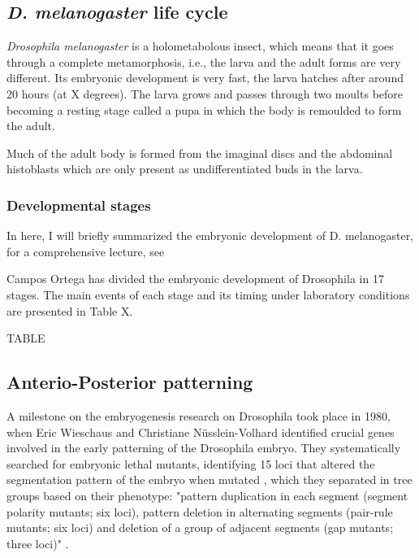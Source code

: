 \subsection{\textit{D. melanogaster} life cycle}

\textit{Drosophila melanogaster} is a holometabolous insect, which means that it goes through a complete metamorphosis, i.e., the larva and the adult forms are very different.
Its embryonic development is very fast, the larva hatches after around 20 hours (at  X degrees).
The larva grows and passes through two moults before becoming a resting stage called a pupa in which
the body is remoulded to form the adult. 

Much of the adult body is formed
from the imaginal discs and the abdominal histoblasts which are only present
as undifferentiated buds in the larva.

\subsubsection{Developmental stages}

In here, I will briefly summarized the embryonic development of D. melanogaster, for a comprehensive lecture, see \citep{Campos-Ortega1985,Gilbert2014}

Campos Ortega has divided the embryonic development of Drosophila in 17 stages. The main events of each stage and its timing under laboratory conditions are presented in Table X.

TABLE



\subsection{Anterio-Posterior patterning}

A milestone on the embryogenesis research on Drosophila took place in 1980, when Eric Wieschaus and Christiane N\"{u}sslein-Volhard identified crucial genes involved in the early patterning of the Drosophila embryo.
They systematically searched for embryonic lethal mutants, identifying 15 loci that altered the segmentation pattern of the embryo when mutated \citep{Nusslein-Volhard1980}, which they separated in tree groups based on their phenotype: "pattern duplication in each
segment (segment polarity mutants; six loci), pattern deletion in
alternating segments (pair-rule mutants; six loci) and deletion of
a group of adjacent segments (gap mutants; three loci)" \citep{Nusslein-Volhard1980}.

